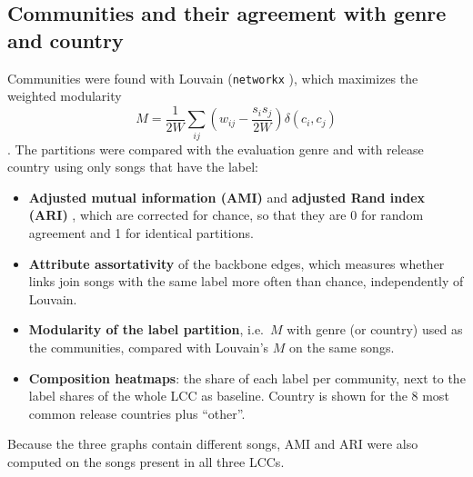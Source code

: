 \subsection*{Communities and their agreement with genre and country}
Communities were found with Louvain \cite{TODO_blondel2008louvain} (\texttt{networkx} \cite{TODO_networkx}), which maximizes the weighted modularity
\begin{equation}
  M = \frac{1}{2W}\sum_{ij}\left(w_{ij} - \frac{s_i s_j}{2W}\right)\delta(c_i,c_j)
\end{equation}
\cite{TODO_newman2004modularity, TODO_newman2004weighted}. The partitions were compared with the evaluation genre and with release country using only songs that have the label:
\begin{itemize}
  \item \textbf{Adjusted mutual information (AMI)} \cite{TODO_vinh2010ami} and \textbf{adjusted Rand index (ARI)} \cite{TODO_hubert1985ari}, which are corrected for chance, so that they are 0 for random agreement and 1 for identical partitions.
  \item \textbf{Attribute assortativity} \cite{TODO_newman2003assortativity} of the backbone edges, which measures whether links join songs with the same label more often than chance, independently of Louvain.
  \item \textbf{Modularity of the label partition}, i.e.\ $M$ with genre (or country) used as the communities, compared with Louvain's $M$ on the same songs.
  \item \textbf{Composition heatmaps}: the share of each label per community, next to the label shares of the whole LCC as baseline. Country is shown for the 8 most common release countries plus ``other''.
\end{itemize}
Because the three graphs contain different songs, AMI and ARI were also computed on the songs present in all three LCCs.

